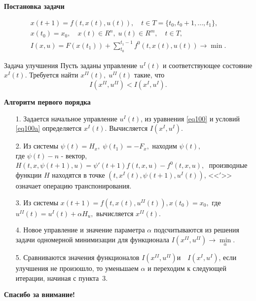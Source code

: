 \documentclass[10pt]{beamer}
\begin{document}
\begin{frame}{\textbf{Постановка задачи} }
\begin{block}{}
  \begin{gather}
x(t+1)=f(t,x(t),u(t)),\quad t \in T=\{t_0,t_0+1,...,t_1\},
	\label{eq100} \\
x(t_0)=x_0,\quad x(t)\in R^n,\; u(t) \in R^m,\quad t\in T,\label{eq100a} \\
I(x,u)=F(x(t_1))+ \sum_{t_0}^{t_1-1}f^0(t,x(t),u(t)) \to \min.
  \label{eq103}
  \end{gather}
\end{block}
\begin{block}{Задача улучшения}
  Пусть заданы управление $u^I(t)$ и соответствующее состояние $x^I(t)$. Требуется найти $x^{I\!I}(t),\; u^{I\!I}(t)$ такие, что
\[
I(x^{I\!I},u^{I\!I}) < I(x^I,u^I).
\]
 \end{block}
\end{frame}
\begin{frame}{\textbf{Алгоритм первого порядка} }
\begin{block}{}
\begin{enumerate}
 \item[1.] Задается начальное управление $u^I(t)$, из уравнения \eqref{eq100} и условий \eqref{eq100a} определяется $x^I(t)$. Вычисляется $I(x^I,u^I).$
 \item[2.] Из системы $\psi(t)=H_x,\;\psi(t_1)=-F_x,$ находим $\psi(t),$\\ где $\psi(t) - n$ - вектор, $H(t,x,\psi(t+1),u)=\psi'(t+1)f(t,x,u)-f^{0}(t,x,u),\;$ производные функции $H$ находятся в точке $\left(t,x^{I}(t),\psi \left(t+1 \right),u^{I}(t)\right)$, <<$'$>> означает операцию  транспонирования.
 \item[3.] Из системы $x(t+1)=f(t,x(t),u^{I\!I}(t)), x(t_0)=x_0,$ где $u^{I\!I}(t)=u^{I}(t)+\alpha H_u,$ вычисляется $x^{I\!I}(t).$
 \item[4.] Новое управление и значение параметра $\alpha$ подсчитываются из решения задачи одномерной минимизации для функционала $I(x^{I\!I},u^{I\!I})\to \min\limits_{\alpha}.$
 \item[5.] Сравниваются значения функционалов $I\left(x^{I\!I},u^{I\!I}\right) \mbox{и}\quad
I\left(x^{I},u^{I}\right)$, если улучшения не произошло, то уменьшаем $\alpha$ и переходим к следующей итерации, начиная с пункта~3.
\end{enumerate}
\end{block}
\end{frame}

\begin{frame}{}
\begin{center}
\Huge\textbf{Спасибо за внимание!}
\end{center}

\end{frame}
\end{document}
